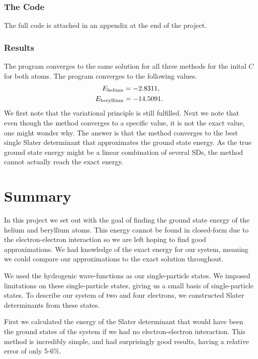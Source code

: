 \documentclass[a4paper, 11pt, notitlepage, english]{article}
\begin{document}
\subsubsection*{The Code}
The full code is attached in an appendix at the end of the project.

\subsubsection*{Results} 
The program converges to the same solution for all three methods for the inital $C$ for both atoms. The program converges to the following values.
\begin{align*}
E_{\rm helium} &= -2.8311, \\
E_{\rm beryllium} &= -14.5091.
\end{align*}
We first note that the variational principle is still fulfilled. Next we note that even though the method converges to a specific value, it is not the exact value, one might wonder why. The answer is that the method converges to the best single Slater determinant that approximates the ground state energy. As the true ground state energy might be a linear combination of several SDs, the method cannot actually reach the exact energy.


\clearpage

\section*{Summary}

In this project we set out with the goal of finding the ground state energy of the helium and beryllium atoms. This energy cannot be found in closed-form due to the electron-electron interaction so we are left hoping to find good approximations. We had knowledge of the exact energy for our system, meaning we could compare our approximations to the exact solution throughout.

We used the hydrogenic wave-functions as our single-particle states. We imposed limitations on these single-particle states, giving us a small basis of single-particle states. To describe our system of two and four electrons, we constructed Slater determinants from these states.

First we calculated the energy of the Slater determinant that would have been the ground states of the system if we had no electron-electron interaction. This method is incredibly simple, and had surprisingly good results, having a relative error of only 5-6\%.
\end{document}
